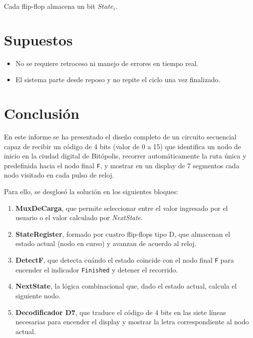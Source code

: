 \documentclass[12pt]{article}
\begin{document}
Cada flip-flop almacena un bit \(State_i\).
\newpage

\section{Supuestos}
\begin{itemize}
    \item No se requiere retroceso ni manejo de errores en tiempo real.
    \item El sistema parte desde reposo y no repite el ciclo una vez finalizado.
\end{itemize}

\section{Conclusión}

En este informe se ha presentado el diseño completo de un circuito secuencial capaz de recibir un código de 4 bits (valor de 0 a 15) que identifica un nodo de inicio en la ciudad digital de Bitópolis, recorrer automáticamente la ruta única y predefinida hacia el nodo final \texttt{F}, y mostrar en un display de 7 segmentos cada nodo visitado en cada pulso de reloj. 

Para ello, se desglosó la solución en los siguientes bloques:
\begin{enumerate}
    \item \textbf{MuxDeCarga}, que permite seleccionar entre el valor ingresado por el usuario o el valor calculado por \textit{NextState}.  
    \item \textbf{StateRegister}, formado por cuatro flip-flops tipo D, que almacenan el estado actual (nodo en curso) y avanzan de acuerdo al reloj.  
    \item \textbf{DetectF}, que detecta cuándo el estado coincide con el nodo final \texttt{F} para encender el indicador \texttt{Finished} y detener el recorrido.  
    \item \textbf{NextState}, la lógica combinacional que, dado el estado actual, calcula el siguiente nodo.  
    \item \textbf{Decodificador D7}, que traduce el código de 4 bits en las siete líneas necesarias para encender el display y mostrar la letra correspondiente al nodo actual.  
\end{enumerate}
\end{document}
